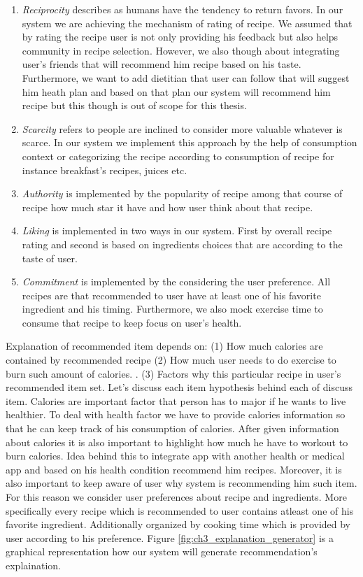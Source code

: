   \begin{enumerate}
	\item \textit{Reciprocity} describes as humans have the tendency to return favors. In our system we are achieving the mechanism of rating of recipe. We assumed that by rating the recipe user is not only providing his feedback but also helps community in recipe selection. However, we also though about integrating user’s friends that will recommend him recipe based on his taste. Furthermore, we want to add dietitian that user can follow that will suggest him heath plan and based on that plan our system will recommend him recipe but this though is out of scope for this thesis.

	\item \textit{Scarcity} refers to people are inclined to consider more valuable whatever is scarce. In our system we implement this approach by the help of consumption context or categorizing the recipe according to consumption of recipe for instance breakfast’s recipes, juices etc. 
	
	\item \textit{Authority}  is implemented by the popularity of recipe among that course of recipe how much star it have and how user think about that  recipe.
	
	\item \textit{Liking} is implemented in two ways in our system. First by overall recipe rating and second is based on ingredients choices that are according to the taste of user.

	\item \textit{Commitment} is implemented by the considering the user preference. All recipes are that recommended to user have at least one of his favorite ingredient and his timing. Furthermore, we also mock exercise time to consume that recipe to keep focus on user’s health.
\end{enumerate}


Explanation of recommended item depends on: (1) How much calories are contained by recommended recipe (2) How much user needs to do exercise to burn such amount of calories. . (3) Factors why this particular recipe in user’s recommended item set. Let’s discuss each item hypothesis behind each of discuss item. Calories are important factor that person has to major if he wants to live healthier. To deal with health factor we have to provide calories information so that he can keep track of his consumption of calories. After given information about calories it is also important to highlight how much he have to workout to burn calories. Idea behind this to integrate app with another health or medical app and based on his health condition recommend him recipes. Moreover, it is also important to keep aware of user why system is recommending him such item. For this reason we consider user preferences about recipe and ingredients. More specifically every recipe which is recommended to user contains atleast one of his favorite ingredient. Additionally organized by cooking time which is provided by user according to his preference. Figure \ref{fig:ch3_explanation_generator} is a graphical representation how our system will generate recommendation’s explaination.

